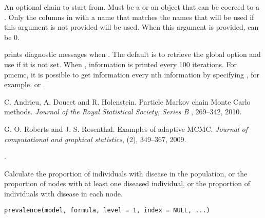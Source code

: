 \documentclass[letterpaper]{book}
\begin{document}
\begin{Arguments}
\begin{ldescription}
\item[\code{chain}] An optional chain to start from. Must be a
 or an object that can be coerced to a
. Only the columns in  with a
name that matches the names that will be used if this argument
is not provided will be used. When this argument is provided,
 can be 0.

\item[\code{verbose}] prints diagnostic messages when . The
default is to retrieve the global option  and
use  if it is not set. When ,
information is printed every 100 iterations. For pmcmc, it is
possible to get information every nth information by
specifying , for example,  or
.
\end{ldescription}
\end{Arguments}
%
\begin{References}
C. Andrieu, A. Doucet and R. Holenstein. Particle Markov chain Monte Carlo methods. \emph{Journal of the Royal Statistical Society, Series B} , 269--342, 2010. 

G. O. Roberts and J. S. Rosenthal. Examples of adaptive MCMC. \emph{Journal of computational and graphical statistics}, (2), 349--367, 2009. 
\end{References}
%
\begin{SeeAlso}
.
\end{SeeAlso}
%
\begin{Description}
Calculate the proportion of individuals with disease in the
population, or the proportion of nodes with at least one diseased
individual, or the proportion of individuals with disease in each
node.
\end{Description}
%
\begin{Usage}
\begin{verbatim}
prevalence(model, formula, level = 1, index = NULL, ...)
\end{verbatim}
\end{Usage}
%
\end{document}
